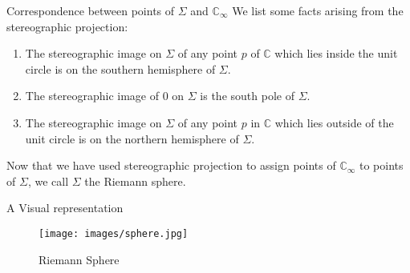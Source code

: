 \documentclass{beamer}
\begin{document}
\begin{frame}{Correspondence between points of $\Sigma$ and $\mathbb{C}_{\infty}$}
We list some facts arising from the stereographic projection:
\begin{enumerate}
    \item The stereographic image on $\Sigma$ of any point $p$ of $\mathbb{C}$ which lies inside the unit circle is on the southern hemisphere of $\Sigma$.
    \item The stereographic image of 0 on $\Sigma$ is the south pole of $\Sigma$.
    \item The stereographic image on $\Sigma$ of any point $p$ in $\mathbb{C}$ which lies outside of the unit circle is on the northern hemisphere of $\Sigma$.
\end{enumerate}
\begin{definition}
Now that we have used stereographic projection to assign points of $\mathbb{C}_{\infty}$ to points of $\Sigma$, we call $\Sigma$ the Riemann sphere.
\end{definition}
\end{frame}


\begin{frame}{A Visual representation}
\begin{figure}
    \centering
     \texttt{[image: images/sphere.jpg]}
    
    \caption{Riemann Sphere}
    \label{fig:my_label}
\end{figure}
\end{frame}
\end{document}
